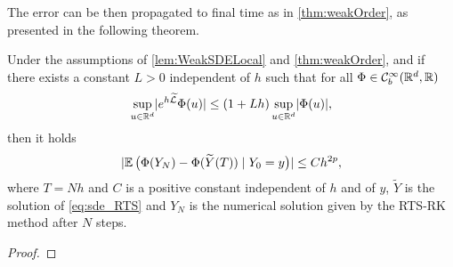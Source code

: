 \documentclass[10pt]{article}
\begin{document}
The error can be then propagated to final time as in \cref{thm:weakOrder}, as presented in the following theorem. 
\begin{theorem} Under the assumptions of \cref{lem:WeakSDELocal} and \cref{thm:weakOrder}, and if there exists a constant $L > 0$ independent of $h$ such that for all $\Phi \in \mathcal C^\infty_b(\mathbb{R}^d, \mathbb{R})$ 
	\begin{equation}
		\sup_{u\in\mathbb{R}^d} \lvert e^{h\widetilde {\mathcal{L}}}\Phi(u)\rvert \leq (1 + Lh)\sup_{u\in\mathbb{R}^d}\lvert\Phi(u)\rvert,
	\end{equation}
	then it holds
	\begin{equation}
		\lvert\operatorname{\mathbb{E}}\big(\Phi(Y_N)- \Phi(\widetilde Y(T))\mid Y_0 = y\big)\rvert \leq Ch^{2p},
	\end{equation}
	where $T = Nh$ and $C$ is a positive constant independent of $h$ and of $y$, $\tilde Y$ is the solution of \eqref{eq:sde_RTS} and $Y_N$ is the numerical solution given by the RTS-RK method after $N$ steps.
\end{theorem} 
\begin{proof} 
\end{proof}
\end{document}
